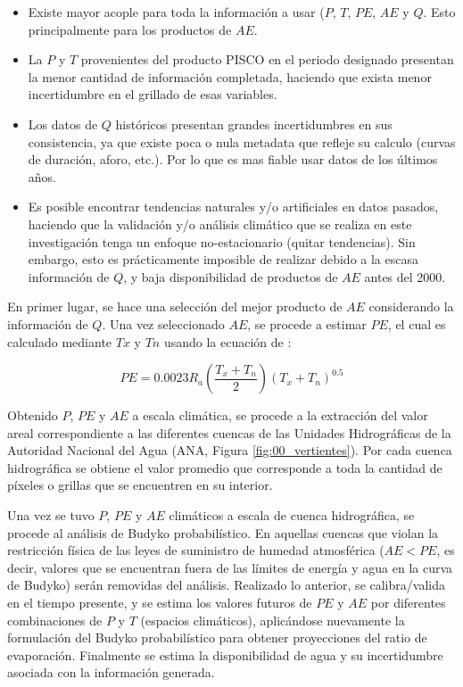 \documentclass[12pt]{article}
\begin{document}
\begin{itemize}

	\item Existe mayor acople para toda la información a usar ($P$, $T$, $PE$, $AE$ y $Q$. Esto principalmente para los productos de $AE$.
	
	\item La $P$ y $T$ provenientes del producto PISCO en el periodo designado presentan la menor cantidad de información completada, haciendo que exista menor incertidumbre en el grillado de esas variables.
	
	\item Los datos de $Q$ históricos presentan grandes incertidumbres en sus consistencia, ya que existe poca o nula metadata que refleje su calculo (curvas de duración, aforo, etc.). Por lo que es mas fiable usar datos de los últimos años.
	
	\item Es posible encontrar tendencias naturales y/o artificiales en datos pasados, haciendo que la validación y/o análisis climático que se realiza en este investigación tenga un enfoque no-estacionario (quitar tendencias). Sin embargo, esto es prácticamente imposible de realizar debido a la escasa información de $Q$, y baja disponibilidad de productos de $AE$ antes del 2000.
	
\end{itemize}

En primer lugar, se hace una selección del mejor producto de $AE$ considerando la información de $Q$. Una vez seleccionado $AE$, se procede a estimar $PE$, el cual es calculado mediante $Tx$ y $Tn$ usando la ecuación de \citet{Hargreaves1985}:

\begin{equation}
PE = 0.0023R_{a}\left ( \frac{T_{x}+T_{n}}{2} \right )\left ( T_{x}+T_{n} \right )^{0.5}
\end{equation}

Obtenido $P$, $PE$ y $AE$ a escala climática, se procede a la extracción del valor areal correspondiente a las diferentes cuencas de las Unidades Hidrográficas de la Autoridad Nacional del Agua (ANA, Figura \ref{fig:00_vertientes}). Por cada cuenca hidrográfica se obtiene el valor promedio que corresponde a toda la cantidad de píxeles o grillas que se encuentren en su interior.

Una vez se tuvo $P$, $PE$ y $AE$ climáticos a escala de cuenca hidrográfica, se procede al análisis de Budyko probabilístico. En aquellas cuencas que violan la restricción física de las leyes de suministro de humedad atmosférica ($AE < PE$, es decir, valores que se encuentran fuera de las límites de energía y agua en la curva de Budyko) serán removidas del análisis. Realizado lo anterior, se calibra/valida en el tiempo presente, y se estima los valores futuros de $PE$ y $AE$ por diferentes combinaciones de $P$ y $T$ (espacios climáticos), aplicándose nuevamente la formulación del Budyko probabilístico para obtener proyecciones del ratio de evaporación. Finalmente se estima la disponibilidad de agua y su incertidumbre asociada con la información generada.
\end{document}
